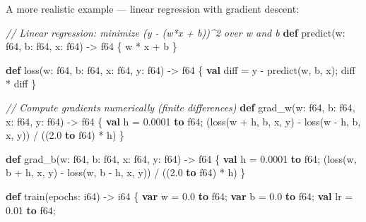 \documentclass[
  english,
]{book}
\newenvironment{Shaded}{\begin{snugshade}}{\end{snugshade}}
\newcommand{\CommentTok}[1]{\textcolor[rgb]{0.42,0.60,0.33}{\textit{#1}}}
\newcommand{\DataTypeTok}[1]{\textcolor[rgb]{0.31,0.79,0.69}{#1}}
\newcommand{\FloatTok}[1]{\textcolor[rgb]{0.71,0.81,0.66}{#1}}
\newcommand{\KeywordTok}[1]{\textcolor[rgb]{0.34,0.61,0.84}{\textbf{#1}}}
\newcommand{\NormalTok}[1]{\textcolor[rgb]{0.83,0.83,0.83}{#1}}
\newcommand{\OperatorTok}[1]{\textcolor[rgb]{0.83,0.83,0.83}{#1}}
\begin{document}
A more realistic example --- linear regression with gradient descent:

\begin{Shaded}
\begin{Highlighting}[]
\CommentTok{// Linear regression: minimize (y {-} (w*x + b))\^{}2 over w and b}
\KeywordTok{def}\NormalTok{ predict(w: }\DataTypeTok{f64}\NormalTok{, b: }\DataTypeTok{f64}\NormalTok{, x: }\DataTypeTok{f64}\NormalTok{) }\OperatorTok{{-}\textgreater{}} \DataTypeTok{f64}\NormalTok{ \{}
\NormalTok{    w }\OperatorTok{*}\NormalTok{ x }\OperatorTok{+}\NormalTok{ b}
\NormalTok{\}}

\KeywordTok{def}\NormalTok{ loss(w: }\DataTypeTok{f64}\NormalTok{, b: }\DataTypeTok{f64}\NormalTok{, x: }\DataTypeTok{f64}\NormalTok{, y: }\DataTypeTok{f64}\NormalTok{) }\OperatorTok{{-}\textgreater{}} \DataTypeTok{f64}\NormalTok{ \{}
    \KeywordTok{val}\NormalTok{ diff }\OperatorTok{=}\NormalTok{ y }\OperatorTok{{-}}\NormalTok{ predict(w, b, x);}
\NormalTok{    diff }\OperatorTok{*}\NormalTok{ diff}
\NormalTok{\}}

\CommentTok{// Compute gradients numerically (finite differences)}
\KeywordTok{def}\NormalTok{ grad\_w(w: }\DataTypeTok{f64}\NormalTok{, b: }\DataTypeTok{f64}\NormalTok{, x: }\DataTypeTok{f64}\NormalTok{, y: }\DataTypeTok{f64}\NormalTok{) }\OperatorTok{{-}\textgreater{}} \DataTypeTok{f64}\NormalTok{ \{}
    \KeywordTok{val}\NormalTok{ h }\OperatorTok{=} \FloatTok{0.0001} \KeywordTok{to} \DataTypeTok{f64}\NormalTok{;}
\NormalTok{    (loss(w }\OperatorTok{+}\NormalTok{ h, b, x, y) }\OperatorTok{{-}}\NormalTok{ loss(w }\OperatorTok{{-}}\NormalTok{ h, b, x, y)) }\OperatorTok{/}\NormalTok{ ((}\FloatTok{2.0} \KeywordTok{to} \DataTypeTok{f64}\NormalTok{) }\OperatorTok{*}\NormalTok{ h)}
\NormalTok{\}}

\KeywordTok{def}\NormalTok{ grad\_b(w: }\DataTypeTok{f64}\NormalTok{, b: }\DataTypeTok{f64}\NormalTok{, x: }\DataTypeTok{f64}\NormalTok{, y: }\DataTypeTok{f64}\NormalTok{) }\OperatorTok{{-}\textgreater{}} \DataTypeTok{f64}\NormalTok{ \{}
    \KeywordTok{val}\NormalTok{ h }\OperatorTok{=} \FloatTok{0.0001} \KeywordTok{to} \DataTypeTok{f64}\NormalTok{;}
\NormalTok{    (loss(w, b }\OperatorTok{+}\NormalTok{ h, x, y) }\OperatorTok{{-}}\NormalTok{ loss(w, b }\OperatorTok{{-}}\NormalTok{ h, x, y)) }\OperatorTok{/}\NormalTok{ ((}\FloatTok{2.0} \KeywordTok{to} \DataTypeTok{f64}\NormalTok{) }\OperatorTok{*}\NormalTok{ h)}
\NormalTok{\}}

\KeywordTok{def}\NormalTok{ train(epochs: }\DataTypeTok{i64}\NormalTok{) }\OperatorTok{{-}\textgreater{}} \DataTypeTok{i64}\NormalTok{ \{}
    \KeywordTok{var}\NormalTok{ w }\OperatorTok{=} \FloatTok{0.0} \KeywordTok{to} \DataTypeTok{f64}\NormalTok{;}
    \KeywordTok{var}\NormalTok{ b }\OperatorTok{=} \FloatTok{0.0} \KeywordTok{to} \DataTypeTok{f64}\NormalTok{;}
    \KeywordTok{val}\NormalTok{ lr }\OperatorTok{=} \FloatTok{0.01} \KeywordTok{to} \DataTypeTok{f64}\NormalTok{;}


\end{Highlighting}
\end{Shaded}
\end{document}
